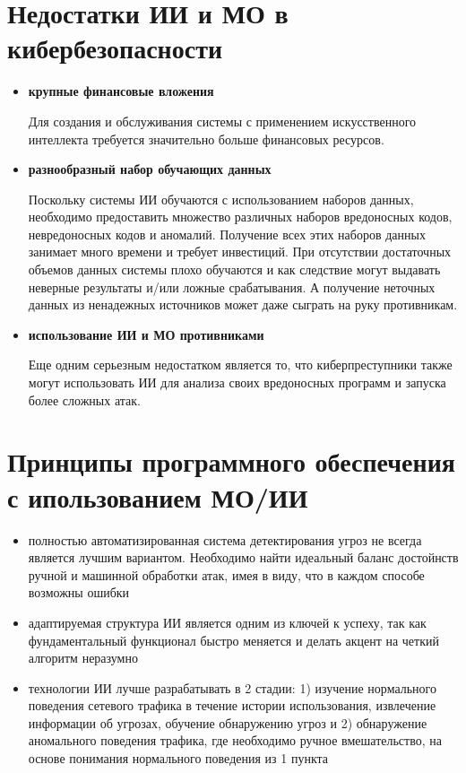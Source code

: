 \documentclass{article}
\begin{document}
	\section*{Недостатки ИИ и МО в кибербезопасности}
	\begin{itemize}
		\item \textbf{крупные финансовые вложения}
		
		Для создания и обслуживания системы с применением искусственного интеллекта требуется значительно больше финансовых ресурсов.
		\item \textbf{разнообразный набор обучающих данных}
		
		Поскольку системы ИИ обучаются с использованием наборов данных, необходимо предоставить множество различных наборов вредоносных кодов, невредоносных кодов и аномалий. Получение всех этих наборов данных занимает много времени и требует инвестиций.
		При отсутствии достаточных объемов данных системы плохо обучаются и как следствие могут выдавать неверные результаты и/или ложные срабатывания. А получение неточных данных из ненадежных источников может даже сыграть на руку противникам.
		\item \textbf{использование ИИ и МО противниками}
		
		Еще одним серьезным недостатком является то, что киберпреступники также могут использовать ИИ для анализа своих вредоносных программ и запуска более сложных атак.
		
	\end{itemize}
	
	\section*{Принципы программного обеспечения с ипользованием МО/ИИ}
	\begin{itemize}
		\item полностью автоматизированная система детектирования угроз не всегда является лучшим вариантом. Необходимо найти идеальный баланс достойнств ручной и машинной обработки атак, имея в виду, что в каждом способе возможны ошибки
		\item адаптируемая структура ИИ является одним из ключей к успеху, так как фундаментальный функционал быстро меняется и делать акцент на четкий алгоритм неразумно
		\item технологии ИИ лучше разрабатывать в 2 стадии: 1) изучение нормального поведения сетевого трафика в течение истории использования, извлечение информации об угрозах, обучение обнаружению угроз и 2) обнаружение аномального поведения трафика, где необходимо ручное вмешательство, на основе понимания нормального поведения из 1 пункта
		
	\end{itemize}
	
\end{document}
